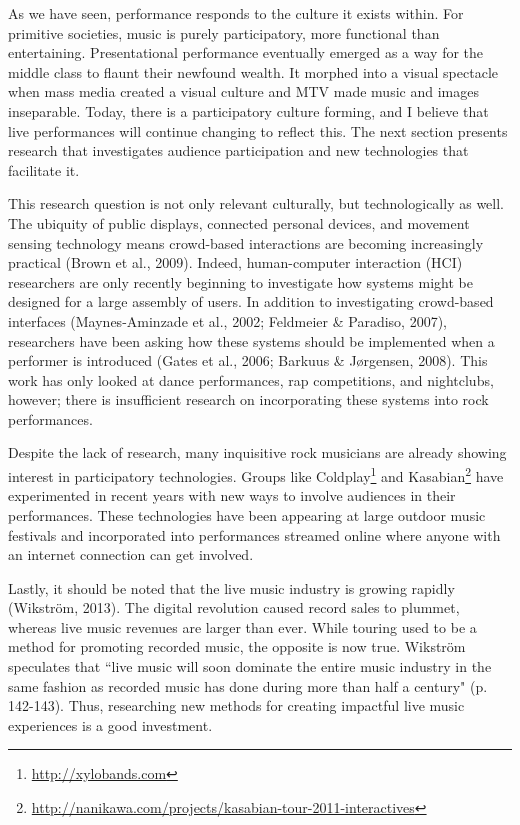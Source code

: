 As we have seen, performance responds to the culture it exists within. For primitive societies, music is purely participatory, more functional than entertaining. Presentational performance eventually emerged as a way for the middle class to flaunt their newfound wealth. It morphed into a visual spectacle when mass media created a visual culture and MTV made music and images inseparable. Today, there is a participatory culture forming, and I believe that live performances will continue changing to reflect this. The next section presents research that investigates audience participation and new technologies that facilitate it.

This research question is not only relevant culturally, but technologically as well. The ubiquity of public displays, connected personal devices, and movement sensing technology means crowd-based interactions are becoming increasingly practical (Brown et al., 2009). Indeed, human-computer interaction (HCI) researchers are only recently beginning to investigate how systems might be designed for a large assembly of users. In addition to investigating crowd-based interfaces (Maynes-Aminzade et al., 2002; Feldmeier \& Paradiso, 2007), researchers have been asking how these systems should be implemented when a performer is introduced (Gates et al., 2006; Barkuus \& J{\o}rgensen, 2008). This work has only looked at dance performances, rap competitions, and nightclubs, however; there is insufficient research on incorporating these systems into rock performances.

Despite the lack of research, many inquisitive rock musicians are already showing interest in participatory technologies. Groups like Coldplay\footnote{\url{http://xylobands.com}} and Kasabian\footnote{\url{http://nanikawa.com/projects/kasabian-tour-2011-interactives}} have experimented in recent years with new ways to involve audiences in their performances. These technologies have been appearing at large outdoor music festivals and incorporated into performances streamed online where anyone with an internet connection can get involved.

Lastly, it should be noted that the live music industry is growing rapidly (Wikstr\"{o}m, 2013). The digital revolution caused record sales to plummet, whereas live music revenues are larger than ever. While touring used to be a method for promoting recorded music, the opposite is now true. Wikstr\"{o}m speculates that ``live music will soon dominate the entire music industry in the same fashion as recorded music has done during more than half a century" (p. 142-143). Thus, researching new methods for creating impactful live music experiences is a good investment.

